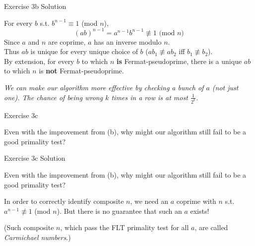 \documentclass[10pt]{beamer}
\begin{document}
\begin{frame}[fragile]{Exercise 3b {\color{red} Solution}}

{\color{red}
For every $b$ s.t. $b^{n - 1} \equiv 1$ (mod $n$),
$$(ab)^{n - 1} = a^{n - 1}b^{n - 1} \not\equiv 1 \text{ (mod }n\text{)}$$
Since $a$ and $n$ are coprime, $a$ has an inverse modulo $n$. \\
Thus $ab$ is unique for every unique choice of $b$
($ab_1 \not\equiv ab_2$ iff $b_1 \not\equiv b_2$). \\
By extension, for every $b$ to which $n$ \textbf{is} Fermat-pseudoprime,
there is a unique $ab$ to which $n$ is \textbf{not} Fermat-pseudoprime.

\textit{We can make our algorithm more effective by checking a bunch of $a$ (not just one). The chance of being wrong $k$ times in a row is at most $\frac{1}{2^k}$.}
}

\end{frame}

\begin{frame}[fragile]{Exercise 3c}

Even with the improvement from (b), why might our algorithm still fail to be a good primality test?

\end{frame}

\begin{frame}[fragile]{Exercise 3c {\color{red} Solution}}

Even with the improvement from (b), why might our algorithm still fail to be a good primality test?

{\color{red}
In order to correctly identify composite $n$, we need an $a$ coprime with $n$ s.t. $a^{n - 1} \not\equiv 1$ (mod $n$). But there is no guarantee that such an $a$ exists!

(Such composite $n$, which pass the FLT primality test for all $a$, are called \textit{Carmichael numbers}.)
}

\end{frame}
\end{document}
